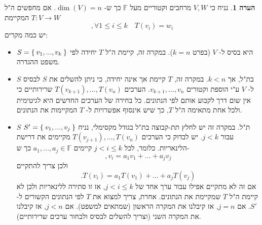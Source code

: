 \documentclass[12pt]{report}
\theoremstyle{plain}
\theoremstyle{definition}
\newtheorem{remark}{הערה}[chapter]
\newcommand{\F}{\mathbb{F}}
\newcommand{\0}{\mathbf{0}}
\begin{document}
\begin{remark}
נניח כי
$V,W$
מרחבים וקטוריים מעל 
$\F$
כך ש-
$\dim(V)=n$.
אם מחפשים ה"ל
$T:V\to W$
המקיימת
$$
,\forall 1\leq i\leq k \quad T(v_i)=w_i
$$
יש כמה מקרים:

\begin{itemize}
\item 
$S=\Set{v_1,...,v_k}$
היא בסיס ל-
$V$
(בפרט
$k=n$).
במקרה זה, קיימת ה"ל
$T$
יחידה לפי משפט ההגדרה.


\item
$S$
בת"ל, אך
$k<n$.
במקרה זה, 
$T$
קיימת אך אינה יחידה, כי ניתן להשלים את
$S$
לבסיס ל-
$V$
ע"י הוספת וקטורים
$v_{k+1},...,v_n$.
הערכים 
$T(v_{k+1}),...,T(v_n)$
שרירותיים כי אין שום דרך לקבוע אותם לפי הנתונים. כל בחירה של הערכים החדשים היא לגיטימית ולכל אחת מתאימה ה"ל 
$T$,
כך שיש אינסוף אפשרויות ל-
$T$
המקיימות את הנתונים.


\item
$S$
ת"ל. במקרה זה יש לחלץ תת-קבוצה בת"ל בגודל מקסימלי, נניח
$S'=\Set{v_1,...,v_j}$
עבור 
$j<k$.
יש לבדוק כי הערכים
$T(v_{j+1}),...,T(v_n)$
מקיימים את דרישת הלינאריות. כלומר, לכל 
$j<i\leq k$
קיימים 
$a_1,...,a_j\in\F$
כך ש-
$$
,v_i=a_1v_1+...+a_jv_j
$$
ולכן צריך להתקיים
$$
.T(v_i)=a_1T(v_1)+...+a_jT(v_j)
$$
אם זה לא מתקיים אפילו עבור ערך אחד של 
$j<i\leq k$,
אז זו סתירה ללינאריות ולכן לא קיימת ה"ל
$T$
שמקיימת את הנתונים. אחרת, צריך למצוא את
$T$
לפי הנתונים הקשורים ל-
$S'$.
אם 
$j=n$,
אז קיבלנו את המקרה הראשון (שמתאים למשפט). אם 
$j<n$,
אז קיבלנו את המקרה השני (וצריך להשלים לבסיס ולבחור ערכים שרירותיים).


\end{itemize}
\end{remark}
\end{document}
